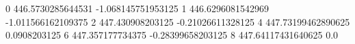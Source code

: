 0 446.5730285644531 -1.068145751953125
1 446.6296081542969 -1.011566162109375
2 447.430908203125 -0.21026611328125
4 447.73199462890625 0.0908203125
6 447.357177734375 -0.28399658203125
8 447.64117431640625 0.0
